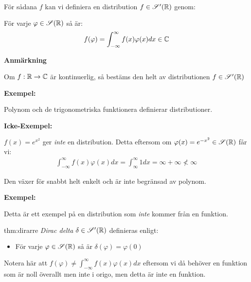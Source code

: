 \par\bigskip
\noindent För sådana $f$ kan vi definiera en distribution $f\in\mathscr{S}^{\prime}(\mathbb{R})$ genom:\par
För varje $\varphi\in\mathscr{S}(\mathbb{R})$ så är:
\begin{equation*}
  \begin{gathered}
    f(\varphi) = \int_{-\infty}^{\infty}f(x)\varphi(x)dx\in\mathbb{C}
  \end{gathered}
\end{equation*}
\par\bigskip
\noindent\textbf{Anmärkning}\par
\noindent Om $f:\mathbb{R}\to\mathbb{C}$ är kontinuerlig, så bestäms den helt av distributionen $f\in\mathscr{S}^{\prime}(\mathbb{R})$ 
\par\bigskip
\noindent\textbf{Exempel:}\par
\noindent Polynom och de trigonometriska funktionera definierar distributioner.
\par\bigskip
\noindent\textbf{Icke-Exempel:}\par
\noindent $f(x) = e^{x^2}$ ger \textit{inte} en distribution. Detta eftersom om $\varphi(x) = e^{-x^2}\in\mathscr{S}(\mathbb{R})$ får vi:
\begin{equation*}
  \begin{gathered}
    \int_{-\infty}^{\infty}f(x)\varphi(x)dx = \int_{\infty}^{\infty}1dx = \infty+\infty \not<\infty
  \end{gathered}
\end{equation*}
\par\bigskip
\noindent Den växer för snabbt helt enkelt och är inte begränsad av polynom.
\par\bigskip
\noindent\textbf{Exempel:}\par
\noindent Detta är ett exempel på en distribution som \textit{inte} kommer från en funktion.
\par\bigskip
\begin{theo}{thm:dirarre}
  \textit{Dirac delta} $\delta\in\mathscr{S}^{\prime}(\mathbb{R})$ definieras enligt:\par
  \begin{itemize}
    \item För varje $\varphi\in\mathscr{S}(\mathbb{R})$ så är $\delta(\varphi) = \varphi(0)$
  \end{itemize}
  \par\bigskip
  \noindent Notera här att $f(\varphi)\neq\int_{-\infty}^{\infty}f(x)\varphi(x)dx$ eftersom vi då behöver en funktion som är noll överallt men inte i origo, men detta är inte en funktion.
\end{theo}
